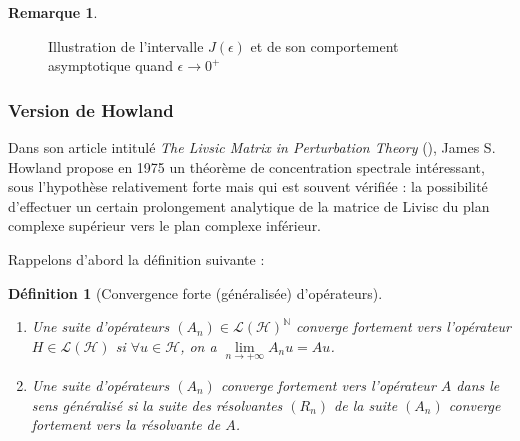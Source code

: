 \documentclass[12pt,openany,a4paper, titlepage]{article}
\newcommand{\N}{\mathbb{N}}
\newcommand{\HH}{\mathcal{H}}
\newtheorem{Def}{Définition}
\theoremstyle{definition}
\theoremstyle{definition}
\theoremstyle{definition}
\theoremstyle{definition}
\theoremstyle{definition}
\newtheorem{rem}{Remarque}
\theoremstyle{definition}
\begin{document}
\begin{rem}
\begin{figure}[h]
    \caption{Illustration de l'intervalle $J(\epsilon)$ et de son comportement asymptotique quand $\epsilon \rightarrow 0^+$}
    \label{fig:enter-label}
\end{figure}      



\subsubsection{Version de Howland}

Dans son article intitulé \textit{The Livsic  Matrix in Perturbation Theory}  (\cite{HOWLAND1975415}), James S. Howland propose en 1975 un théorème de concentration spectrale intéressant, sous l'hypothèse relativement forte mais qui est souvent vérifiée : la possibilité d'effectuer un certain prolongement analytique de la matrice de Livisc du plan complexe supérieur vers le plan complexe inférieur.

Rappelons d'abord la définition suivante :
\begin{Def}[Convergence forte (généralisée) d'opérateurs]
\,
    \begin{enumerate}
        \item Une suite d'opérateurs $(A_n)\in\mathcal{L}(\HH)^\N$ converge fortement vers l'opérateur $H\in\mathcal{L}(\HH)$ si $\forall u\in \HH$, on a
        $\lim\limits_{n\rightarrow +\infty} A_n u = Au$.
        \item Une suite d'opérateurs $(A_n)$ converge fortement vers l'opérateur $A$ dans le sens généralisé si la suite des résolvantes $(R_n)$ de la suite $(A_n)$ converge fortement vers la résolvante de $A$.
    \end{enumerate}
\end{Def}


\end{rem}
\end{document}
